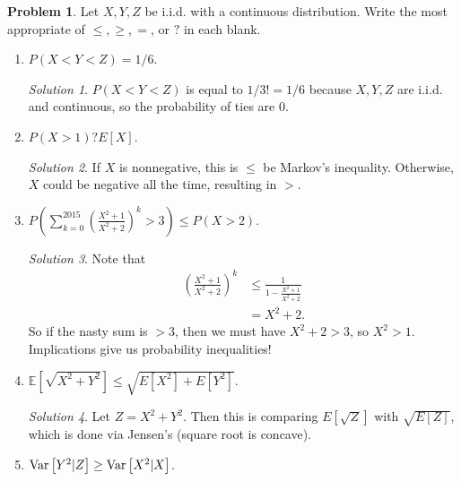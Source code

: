 \documentclass[11pt]{article}
\theoremstyle{definition}
\newtheorem{prob}[theo]{\color{Maroon} Problem}
\theoremstyle{remark}
\newtheorem*{soln}{\color{Maroon} Solution}
\newcommand{\E}[1]{\mathbb{E}\left[ #1 \right]}
\renewcommand{\var}[1]{\textnormal{Var}\left[ #1 \right]}
\begin{document}
\begin{prob} Let $X,Y,Z$ be i.i.d. with a continuous distribution. Write the most appropriate of $\leq, \geq, = $, or $?$ in each blank.

\begin{enumerate}[label = (\alph*)]
    \item $P(X<Y<Z) = 1/6$. 
    
    \begin{soln} $P(X<Y<Z)$ is equal to $1/3!=1/6$ because $X,Y,Z$ are i.i.d. and continuous, so the probability of ties are $0$.
    \end{soln}
    
    \dotfill
    
    \item $P(X > 1) ? E[X]$. 
    
    \begin{soln} If $X$ is nonnegative, this is $\le$ be Markov's inequality. Otherwise, $X$ could be negative all the time, resulting in $>$.
    \end{soln}
    
    \dotfill
    
    \item $P \left( \sum_{k=0}^{2015} \left(\frac{X^2+1}{X^2+2}\right)^k > 3 \right) \leq P( X > 2 )$.
    
    \begin{soln}
    Note that 
    \begin{align*}
        \left(\frac{X^2+1}{X^2+2}\right)^k &\le \frac{1}{1 - \frac{X^2+1}{X^2+2}} \\
        &= X^2 + 2.
    \end{align*}
    So if the nasty sum is $>3$, then we must have $X^2 + 2 > 3$, so $X^2 > 1$. Implications give us probability inequalities!
    \end{soln}
    
    \dotfill
    
    \item $\E{\sqrt{X^2 + Y^2}} \le \sqrt{E[X^2] + E[Y^2]}$. 
    
    \begin{soln} Let $Z = X^2 + Y^2$. Then this is comparing $E[\sqrt{Z}]$ with $\sqrt{E[Z]}$, which is done via Jensen's (square root is concave).
    \end{soln}
    
    \dotfill
    
    \item $\var{Y^2|Z} \ge \var{X^2|X}$.
    

\end{enumerate}
\end{prob}
\end{document}
